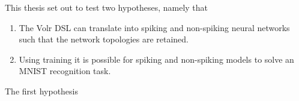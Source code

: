 \documentclass[report.tex]{subfiles}
\begin{document}
This thesis set out to test two hypotheses, namely that

\begin{enumerate}
  \item The Volr DSL can translate into spiking and non-spiking neural networks such that the network topologies are retained.
  \item Using training it is possible for spiking and non-spiking models to solve an MNIST recognition task.
\end{enumerate}

The first hypothesis 

% 
\end{document}

